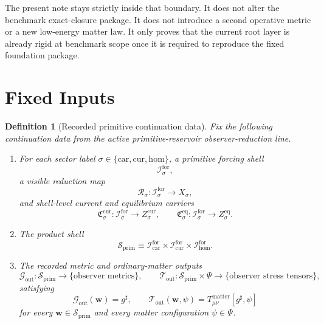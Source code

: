 \documentclass[11pt]{article}
\newcommand{\CompletedMetric}{g^{\sharp}}
\newcommand{\MatterSpace}{\Psi}
\newcommand{\Car}{\mathrm{car}}
\newcommand{\Cur}{\mathrm{cur}}
\newcommand{\Hom}{\mathrm{hom}}
\newcommand{\ForSpace}[1]{\mathcal I_{#1}^{\mathrm{for}}}
\newcommand{\PrimShell}{\mathcal S_{\mathrm{prim}}}
\newcommand{\Reduction}[1]{\mathcal R_{#1}}
\newcommand{\CurrentCarrier}[1]{\mathfrak C_{#1}^{\mathrm{cur}}}
\newcommand{\EqCarrier}[1]{\mathfrak C_{#1}^{\mathrm{eq}}}
\newcommand{\MetricOut}{\mathscr G_{\mathrm{out}}}
\newcommand{\MatterOut}{\mathscr T_{\mathrm{out}}}
\newtheorem{definition}{Definition}
\begin{document}
The present note stays strictly inside that boundary. It does not alter the benchmark exact-closure package. It does not introduce a second operative metric or a new low-energy matter law. It only proves that the current root layer is already rigid at benchmark scope once it is required to reproduce the fixed foundation package.

\section{Fixed Inputs}

\begin{definition}[Recorded primitive continuation data]
\label{def:fixed}
Fix the following continuation data from the active primitive-reservoir observer-reduction line.
\begin{enumerate}
    \item For each sector label \(\sigma\in\{\Car,\Cur,\Hom\}\), a primitive forcing shell
    \[
    \ForSpace{\sigma},
    \]
    a visible reduction map
    \[
    \Reduction{\sigma}:\ForSpace{\sigma}\to X_{\sigma},
    \]
    and shell-level current and equilibrium carriers
    \[
    \CurrentCarrier{\sigma}:\ForSpace{\sigma}\to Z_{\sigma}^{\mathrm{cur}},
    \qquad
    \EqCarrier{\sigma}:\ForSpace{\sigma}\to Z_{\sigma}^{\mathrm{eq}}.
    \]
    \item The product shell
    \[
    \PrimShell
    \equiv
    \ForSpace{\Car}\times \ForSpace{\Cur}\times \ForSpace{\Hom}.
    \]
    \item The recorded metric and ordinary-matter outputs
    \[
    \MetricOut:\PrimShell\to\{\text{observer metrics}\},
    \qquad
    \MatterOut:\PrimShell\times\MatterSpace\to\{\text{observer stress tensors}\},
    \]
    satisfying
    \begin{equation}
    \MetricOut(\mathbf w)=\CompletedMetric,
    \qquad
    \MatterOut(\mathbf w,\psi)
    =
    T_{\mu\nu}^{\mathrm{matter}}[\CompletedMetric,\psi]
    \label{eq:fixedoutputs}
    \end{equation}
    for every \(\mathbf w\in\PrimShell\) and every matter configuration \(\psi\in\MatterSpace\).
\end{enumerate}
\end{definition}
\end{document}
